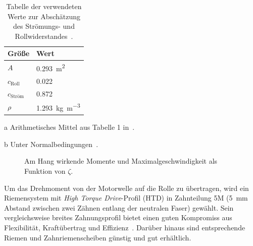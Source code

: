 		\begin{table}[h]
			\caption[Tabelle der verwendeten Werte zur Abschätzung des Strömungs- und Rollwiderstandes]{Tabelle der verwendeten Werte zur Abschätzung des Strömungs- und Rollwiderstandes~\cites{GESTIS.Luft}{material.advances.skateboarding.WATERMAN1978}{air.drag.human.body.VANINGENSCHENAU1982}.}%
			\label{tab:drag roll values}
			\centering
			\begin{threeparttable}
				\begin{tabular}{ll}
					\toprule
					Größe\hspace{1cm}								& Wert\\ \midrule
					\(A\)\tnote{a}\hspace{1cm}						& \qty{0,293}{\metre\squared}\\
					\(c_\text{Roll}\)\hspace{1cm}					& \num{0,022}\\
					\(c_\text{Ström}\)\tnote{a}\hspace{1cm}			& \num{0,872}\\
					\(\rho\)\tnote{b}\hspace{1cm}					& \qty{1,293}{\kilo\gram\per\metre\cubed}\\ \bottomrule
				\end{tabular}
				\begin{tablenotes}\footnotesize
					\item[a]	Arithmetisches Mittel aus Tabelle 1 in~\cite{air.drag.human.body.VANINGENSCHENAU1982}.
					\item[b]	Unter Normalbedingungen~\cite{GESTIS.Luft}.
				\end{tablenotes}
			\end{threeparttable}
		\end{table}
		\begin{figure}[h]
			\centering
			
			\caption[Am Hang wirkende Momente und Maximalgeschwindigkeit als Funktion von \(\zeta\)]{Am Hang wirkende Momente und Maximalgeschwindigkeit als Funktion von \(\zeta\).}%
			\label{fig:torque ratio and vmax vs zetas}
		\end{figure}\par\medskip
		Um das Drehmoment von der Motorwelle auf die Rolle zu übertragen, wird ein Riemensystem mit \textit{High Torque Drive}-Profil (HTD) in Zahnteilung 5M (\qty{5}{mm} Abstand zwischen zwei Zähnen entlang der neutralen Faser) gewählt. 
		Sein vergleichsweise breites Zahnungsprofil bietet einen guten Kompromiss aus Flexibilität, Kraftübertrag und Effizienz~\cite{gates.catalogue.2021}.
		Darüber hinaus sind entsprechende Riemen und Zahnriemenscheiben günstig und gut erhältlich.
		
